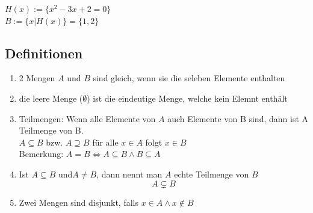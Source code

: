 \documentclass{article}
\begin{document}
        $H(x):=\{x^2-3x+2=0\}$\\
        $B:=\{x|H(x)\}=\{1,2\}$\\
        \subsection*{Definitionen}
            \begin{enumerate}
                \item 2 Mengen $A$ und $B$ sind gleich, wenn sie die seleben Elemente enthalten
                \item die leere Menge ($\emptyset$) ist die eindeutige Menge, welche kein Elemnt enthält
                \item Teilmengen: Wenn alle Elemente von $A$ auch Elemente von B sind, dann ist A Teilmenge von B.\\
                $A\subseteq B$ bzw. $A\supseteq B$ für alle $x\in A$ folgt $x\in B$\\
                Bemerkung: $A=B\iff A\subseteq B\land B\subseteq A$
                \item Ist $A\subseteq B $ und$ A\neq B$, dann nennt man $A$ echte Teilmenge von $B$ $$A\subsetneq B$$
                \item Zwei Mengen sind disjunkt, falls $x\in A\land x\notin B$  
            \end{enumerate}
\end{document}

